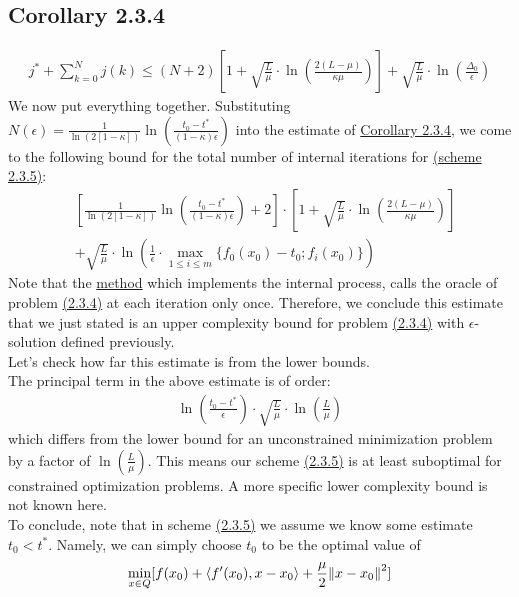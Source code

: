 \documentclass[12pt,a4paper]{article}
\begin{document}
	 \subsection*{Corollary 2.3.4}\label{cor234}
	 \begin{align*}
	 	j^* + \sum_{k=0}^{N}j(k) \leq (N+2)[1 + \sqrt{\frac{L}{\mu}}\cdot \ln(\frac{2(L - \mu)}{\kappa \mu})] + \sqrt{\frac{L}{\mu}}\cdot \ln(\frac{\Delta_0}{\epsilon})
	 \end{align*}
	 We now put everything together. Substituting $N(\epsilon) = \frac{1}{\ln(2[1 - \kappa])}\ln(\frac{t_0 - t^*}{(1 - \kappa)\epsilon})$ into the estimate of \hyperref[cor234]{Corollary 2.3.4}, we come to the following bound for the total number of internal iterations for \hyperref[sec235]{(scheme 2.3.5)}:
	 \begin{align}
	 	&[\frac{1}{\ln(2[1 - \kappa])} \ln(\frac{t_0 - t^*}{(1 - \kappa)\epsilon}) + 2] \cdot [1 + \sqrt{\frac{L}{\mu}}\cdot \ln(\frac{2(L - \mu)}{\kappa \mu})] \\
	 	&+ \sqrt{\frac{L}{\mu}}\cdot \ln(\frac{1}{\epsilon}\cdot \max_{1 \leq i \leq m} \{f_0(x_0) - t_0;f_i(x_0)\})
	 \end{align}
	 Note that the \hyperref[sec:mmschemestrict]{method} which implements the internal process, calls the oracle of problem \hyperref[sec:234]{(2.3.4)} at each iteration only once. Therefore, we conclude this estimate that we just stated is an upper complexity bound for problem \hyperref[sec:234]{(2.3.4)} with $\epsilon$-solution defined previously. \\
	 Let's check how far this estimate is from the lower bounds. \\
	 The principal term in the above estimate is of order:
	 \begin{align*}
	 	\ln(\frac{t_0 - t^*}{\epsilon}) \cdot \sqrt{\frac{L}{\mu}}\cdot \ln(\frac{L}{\mu})
	 \end{align*}
	 which differs from the lower bound for an unconstrained minimization problem by a factor of $\ln(\frac{L}{\mu})$. This means our scheme \hyperref[sec235]{(2.3.5)} is at least suboptimal for constrained optimization problems. A more specific lower complexity bound is not known here. \\
	 To conclude, note that in scheme \hyperref[sec235]{(2.3.5)} we assume we know some estimate $t_0 < t^*$. Namely, we can simply choose $t_0$ to be the optimal value of
	 \begin{align*}
	 	\min_{x \in Q}[f(x_0) + \langle f'(x_0), x - x_0 \rangle + \frac{\mu}{2}\norm{x - x_0}^2]
	 \end{align*}
\end{document}
